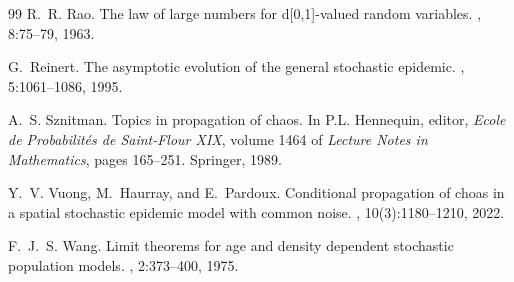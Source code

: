 \documentclass[notitlepage,reqno,11pt]{amsart}
\numberwithin{equation}{section}
\begin{document}
\begin{thebibliography}{99}
R.~R. Rao.
\newblock The law of large numbers for d[0,1]-valued random variables.
, 8:75--79, 1963.

G.~Reinert.
\newblock The asymptotic evolution of the general stochastic epidemic.
, 5:1061--1086, 1995.

A.~S. Sznitman.
\newblock Topics in propagation of chaos.
\newblock In P.L. Hennequin, editor, {\em Ecole de Probabilit\'es de
  Saint-Flour XIX}, volume 1464 of {\em Lecture Notes in Mathematics}, pages
  165--251. Springer, 1989.

Y.~V. Vuong, M.~Haurray, and E.~Pardoux.
\newblock Conditional propagation of choas in a spatial stochastic epidemic
  model with common noise.
, 10(3):1180--1210,
  2022.

F.~J.~S. Wang.
\newblock Limit theorems for age and density dependent stochastic population
  models.
, 2:373--400, 1975.


\end{thebibliography}
\end{document}
